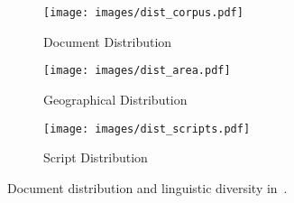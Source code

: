 
\begin{figure*}[!thp]
\centering
\begin{subfigure}{0.33\textwidth}
    \texttt{[image: images/dist\_corpus.pdf]}
    \caption{Document Distribution}
    \label{fig:dist_corpus}
\end{subfigure}
\begin{subfigure}{0.33\textwidth}
    \texttt{[image: images/dist\_area.pdf]}
    \caption{Geographical Distribution}
    \label{fig:dist_geo}
\end{subfigure}
\begin{subfigure}{0.32\textwidth}
    \texttt{[image: images/dist\_scripts.pdf]}
    \caption{Script Distribution}
    \label{fig:dist_scripts}
\end{subfigure}
\vspace{-0.5em}
\caption{Document distribution and linguistic diversity in~\dcad.}
\label{fig:pie_chart}
\vspace{-1em}
\end{figure*}
